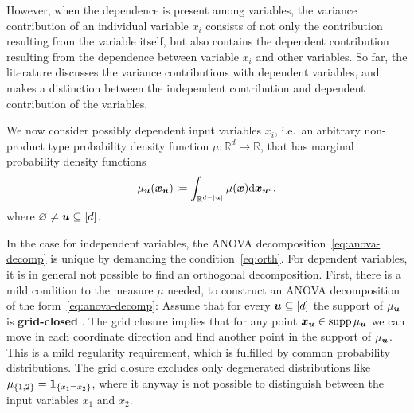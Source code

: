 \documentclass{article}
\renewcommand{\vec}[1]{\ensuremath \mathbf{\boldsymbol{#1}}}
\newcommand{\x}{\ensuremath{\vec x}}
\newcommand{\R}{\ensuremath{\mathbb{R}}}
\newcommand{\dx}{\mathrm{d}}
\DeclareMathOperator*{\supp}{supp}
\theoremstyle{definition}
\numberwithin{equation}{section}
\begin{document}
However, when the dependence is present
among variables, the variance contribution of an individual variable
$x_i$ consists of not only the contribution resulting from the variable itself, but also contains the dependent contribution resulting from the
dependence between variable $x_i$ and other variables. So far, the literature \cite{ LiRa12, Ra142} discusses the variance
contributions with dependent variables, and makes a distinction
between the independent contribution and dependent contribution of the variables.\par

We now consider possibly dependent input variables $x_i$, i.e.~an arbitrary non-product type probability density function $\mu\colon \R^d \rightarrow \R $, that has 
marginal probability density functions 
\begin{equation}
\label{eq:mu_u}\mu_{\vec u}(\x_\vec u) \coloneqq \int_{\R^{d-|\vec u|}} \mu(\x)\dx \vec x_{\vec u^c}, \end{equation}
where $\varnothing \neq \vec u \subseteq [d] $. 

In the case for independent variables, the ANOVA decomposition~\eqref{eq:anova-decomp} is unique by demanding the condition~\eqref{eq:orth}. For dependent variables, it is in general not possible to find an orthogonal decomposition. First, there is a mild condition to the measure $\mu$ needed, to construct an ANOVA decomposition of the form~\eqref{eq:anova-decomp}:
Assume that for every $\vec u\subseteq[d]$ the support of $\mu_{\vec u}$ is \textbf{grid-closed} \cite{Ho07}. The grid closure implies that for any point $\x_{\vec u}\in \supp \mu_{\vec u} $ we can move in each coordinate direction and find another point in the support of $\mu_{\vec u}$. This is a mild regularity requirement, which is fulfilled by common probability distributions. The grid closure excludes only degenerated distributions like $\mu_{\{1,2\}} = \vec 1_{\{x_1 = x_2\}}$, where it anyway is not possible to distinguish between the input variables $x_1$ and $x_2$. 
\end{document}
